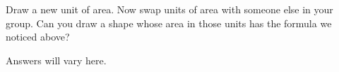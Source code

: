 \documentclass{ximera}
\begin{document}
\begin{problem}
Draw a new unit of area.  Now swap units of area with someone else in your group.  Can you draw a shape whose area in those units has the formula we noticed above?

\begin{solution}
    Answers will vary here.
\end{solution}
\end{problem}
\end{document}
